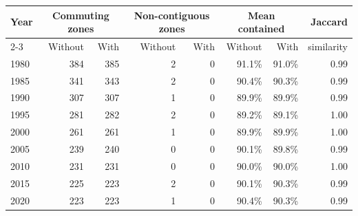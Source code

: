 \begin{tabular}{lrrrrrrr}
\hline\hline
Year & \multicolumn{2}{c}{Commuting zones} & \multicolumn{2}{c}{Non-contiguous zones} & \multicolumn{2}{c}{Mean contained} & Jaccard \\\cline{2-3} \cline{4-5} \cline{6-7}& Without & With & Without & With & Without & With & similarity \\
\hline
1980 & 384 & 385 & 2 & 0 & 91.1\% & 91.0\% & 0.99 \\
1985 & 341 & 343 & 2 & 0 & 90.4\% & 90.3\% & 0.99 \\
1990 & 307 & 307 & 1 & 0 & 89.9\% & 89.9\% & 0.99 \\
1995 & 281 & 282 & 2 & 0 & 89.2\% & 89.1\% & 1.00 \\
2000 & 261 & 261 & 1 & 0 & 89.9\% & 89.9\% & 1.00 \\
2005 & 239 & 240 & 0 & 0 & 90.1\% & 89.8\% & 0.99 \\
2010 & 231 & 231 & 0 & 0 & 90.0\% & 90.0\% & 1.00 \\
2015 & 225 & 223 & 2 & 0 & 90.1\% & 90.3\% & 0.99 \\
2020 & 223 & 223 & 1 & 0 & 90.4\% & 90.3\% & 0.99 \\
\hline\hline
\end{tabular}
